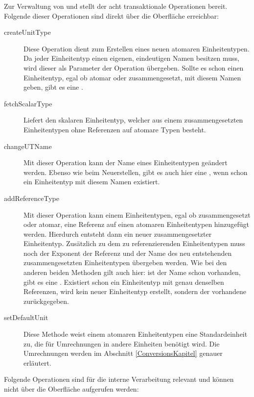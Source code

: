 Zur Verwaltung von  und  stellt der  acht transaktionale Operationen bereit. Folgende dieser Operationen sind direkt über die Oberfläche erreichbar:

\begin{description}
\item[createUnitType]
Diese Operation dient zum Erstellen eines neuen atomaren Einheitentypen. Da jeder Einheitentyp einen eigenen, eindeutigen Namen besitzen muss, wird dieser als Parameter der Operation übergeben. Sollte es schon einen Einheitentyp, egal ob atomar oder zusammengesetzt, mit diesem Namen geben, gibt es eine .
\item[fetchScalarType]
Liefert den skalaren Einheitentyp, welcher aus einem zusammengesetzten Einheitentypen ohne Referenzen auf atomare Typen besteht. 
\item[changeUTName]
Mit dieser Operation kann der Name eines Einheitentypen geändert werden. Ebenso wie beim Neuerstellen, gibt es auch hier eine , wenn schon ein Einheitentyp mit diesem Namen existiert.
\item[addReferenceType]
Mit dieser Operation kann einem Einheitentypen, egal ob zusammengesetzt oder atomar, eine Referenz auf einen atomaren Einheitentypen hinzugefügt werden. Hierdurch entsteht dann ein neuer zusammengesetzter Einheitentyp. Zusätzlich zu dem zu referenzierenden Einheitentypen muss noch der Exponent der Referenz und der Name des neu entstehenden zusammengesetzten Einheitentypen übergeben werden. Wie bei den anderen beiden Methoden gilt auch hier: ist der Name schon vorhanden, gibt es eine . Existiert schon ein Einheitentyp mit genau denselben Referenzen, wird kein neuer Einheitentyp erstellt, sondern der vorhandene zurückgegeben.
\item[setDefaultUnit]
Diese Methode weist einem atomaren Einheitentypen eine Standardeinheit zu, die für Umrechnungen in andere Einheiten benötigt wird. Die Umrechnungen werden im Abschnitt \ref{ConversionsKapitel} genauer erläutert.
\end{description}

Folgende Operationen sind für die interne Verarbeitung relevant und können nicht über die Oberfläche aufgerufen werden:

